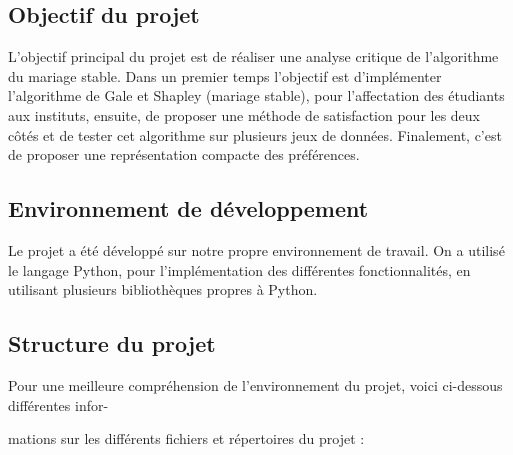 \documentclass[12pt,titlepage]{article}
\begin{document}
\subsection*{Objectif du projet}


L'objectif principal du projet est de réaliser une analyse critique de l'algorithme du mariage stable. Dans un premier temps l'objectif est d'implémenter l'algorithme de Gale et Shapley (mariage stable), pour l'affectation des étudiants aux instituts, ensuite, de proposer une méthode de satisfaction pour les deux côtés et de tester cet algorithme sur plusieurs jeux de données. Finalement, c'est de proposer une représentation compacte des préférences.


\subsection*{Environnement de développement}


Le projet a été développé sur notre propre environnement de travail. On a utilisé le langage Python, pour l'implémentation des différentes fonctionnalités, en utilisant plusieurs bibliothèques propres à Python.


\subsection*{Structure du projet}


Pour une meilleure compréhension de l’environnement du projet, voici ci-dessous différentes infor-

mations sur les différents fichiers et répertoires du projet :
\end{document}
